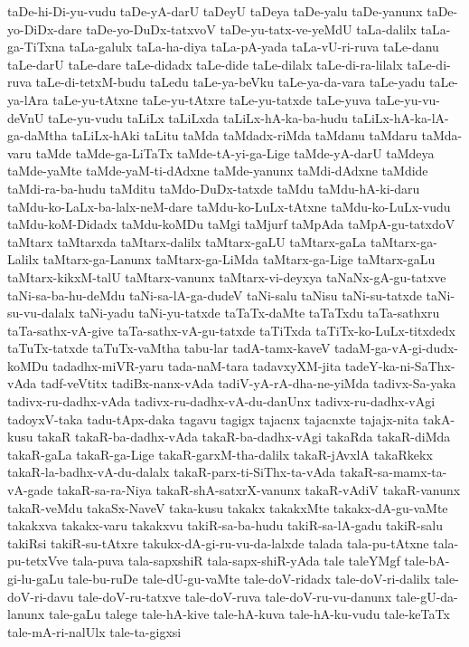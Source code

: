 {taDe-hi-Di-yu-vudu
taDe-yA-darU
taDeyU
taDeya
taDe-yalu
taDe-yanunx
taDe-yo-DiDx-dare
taDe-yo-DuDx-tatxvoV
taDe-yu-tatx-ve-yeMdU
taLa-dalilx
taLa-ga-TiTxna
taLa-galulx
taLa-ha-diya
taLa-pA-yada
taLa-vU-ri-ruva
taLe-danu
taLe-darU
taLe-dare
taLe-didadx
taLe-dide
taLe-dilalx
taLe-di-ra-lilalx
taLe-di-ruva
taLe-di-tetxM-budu
taLedu
taLe-ya-beVku
taLe-ya-da-vara
taLe-yadu
taLe-ya-lAra
taLe-yu-tAtxne
taLe-yu-tAtxre
taLe-yu-tatxde
taLe-yuva
taLe-yu-vu-deVnU
taLe-yu-vudu
taLiLx
taLiLxda
taLiLx-hA-ka-ba-hudu
taLiLx-hA-ka-lA-ga-daMtha
taLiLx-hAki
taLitu
taMda
taMdadx-riMda
taMdanu
taMdaru
taMda-varu
taMde
taMde-ga-LiTaTx
taMde-tA-yi-ga-Lige
taMde-yA-darU
taMdeya
taMde-yaMte
taMde-yaM-ti-dAdxne
taMde-yanunx
taMdi-dAdxne
taMdide
taMdi-ra-ba-hudu
taMditu
taMdo-DuDx-tatxde
taMdu
taMdu-hA-ki-daru
taMdu-ko-LaLx-ba-lalx-neM-dare
taMdu-ko-LuLx-tAtxne
taMdu-ko-LuLx-vudu
taMdu-koM-Didadx
taMdu-koMDu
taMgi
taMjurf
taMpAda
taMpA-gu-tatxdoV
taMtarx
taMtarxda
taMtarx-dalilx
taMtarx-gaLU
taMtarx-gaLa
taMtarx-ga-Lalilx
taMtarx-ga-Lanunx
taMtarx-ga-LiMda
taMtarx-ga-Lige
taMtarx-gaLu
taMtarx-kikxM-talU
taMtarx-vanunx
taMtarx-vi-deyxya
taNaNx-gA-gu-tatxve
taNi-sa-ba-hu-deMdu
taNi-sa-lA-ga-dudeV
taNi-salu
taNisu
taNi-su-tatxde
taNi-su-vu-dalalx
taNi-yadu
taNi-yu-tatxde
taTaTx-daMte
taTaTxdu
taTa-sathxru
taTa-sathx-vA-give
taTa-sathx-vA-gu-tatxde
taTiTxda
taTiTx-ko-LuLx-titxdedx
taTuTx-tatxde
taTuTx-vaMtha
tabu-lar
tadA-tamx-kaveV
tadaM-ga-vA-gi-dudx-koMDu
tadadhx-miVR-yaru
tada-naM-tara
tadavxyXM-jita
tadeY-ka-ni-SaThx-vAda
tadf-veVtitx
tadiBx-nanx-vAda
tadiV-yA-rA-dha-ne-yiMda
tadivx-Sa-yaka
tadivx-ru-dadhx-vAda
tadivx-ru-dadhx-vA-du-danUnx
tadivx-ru-dadhx-vAgi
tadoyxV-taka
tadu-tApx-daka
tagavu
tagigx
tajacnx
tajacnxte
tajajx-nita
takA-kusu
takaR
takaR-ba-dadhx-vAda
takaR-ba-dadhx-vAgi
takaRda
takaR-diMda
takaR-gaLa
takaR-ga-Lige
takaR-garxM-tha-dalilx
takaR-jAvxlA
takaRkekx
takaR-la-badhx-vA-du-dalalx
takaR-parx-ti-SiThx-ta-vAda
takaR-sa-mamx-ta-vA-gade
takaR-sa-ra-Niya
takaR-shA-satxrX-vanunx
takaR-vAdiV
takaR-vanunx
takaR-veMdu
takaSx-NaveV
taka-kusu
takakx
takakxMte
takakx-dA-gu-vaMte
takakxva
takakx-varu
takakxvu
takiR-sa-ba-hudu
takiR-sa-lA-gadu
takiR-salu
takiRsi
takiR-su-tAtxre
takukx-dA-gi-ru-vu-da-lalxde
talada
tala-pu-tAtxne
tala-pu-tetxVve
tala-puva
tala-sapxshiR
tala-sapx-shiR-yAda
tale
taleYMgf
tale-bA-gi-lu-gaLu
tale-bu-ruDe
tale-dU-gu-vaMte
tale-doV-ridadx
tale-doV-ri-dalilx
tale-doV-ri-davu
tale-doV-ru-tatxve
tale-doV-ruva
tale-doV-ru-vu-danunx
tale-gU-da-lanunx
tale-gaLu
talege
tale-hA-kive
tale-hA-kuva
tale-hA-ku-vudu
tale-keTaTx
tale-mA-ri-nalUlx
tale-ta-gigxsi
}
